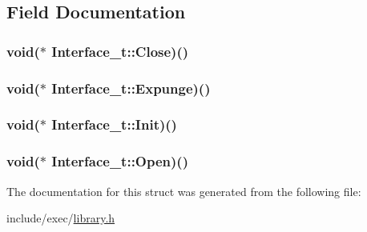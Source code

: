 \subsection{Field Documentation}
\hypertarget{structInterface__t_a289af6f33158db4ca73a76c146ce045d}{
\subsubsection[{Close}]{\setlength{\rightskip}{0pt plus 5cm}void($\ast$ Interface\+\_\+t\+::\+Close)()}}\label{structInterface__t_a289af6f33158db4ca73a76c146ce045d}
\hypertarget{structInterface__t_a35ed82ac93a8526acde92993fff28871}{
\subsubsection[{Expunge}]{\setlength{\rightskip}{0pt plus 5cm}void($\ast$ Interface\+\_\+t\+::\+Expunge)()}}\label{structInterface__t_a35ed82ac93a8526acde92993fff28871}
\hypertarget{structInterface__t_a4ee594e6621396d6d813e11112421db2}{
\subsubsection[{Init}]{\setlength{\rightskip}{0pt plus 5cm}void($\ast$ Interface\+\_\+t\+::\+Init)()}}\label{structInterface__t_a4ee594e6621396d6d813e11112421db2}
\hypertarget{structInterface__t_a736388d3db04a7855355bbf59cdf2a02}{
\subsubsection[{Open}]{\setlength{\rightskip}{0pt plus 5cm}void($\ast$ Interface\+\_\+t\+::\+Open)()}}\label{structInterface__t_a736388d3db04a7855355bbf59cdf2a02}


The documentation for this struct was generated from the following file\+:\begin{DoxyCompactItemize}
\item 
include/exec/\hyperlink{library_8h}{library.\+h}\end{DoxyCompactItemize}
